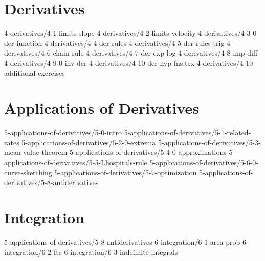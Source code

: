 \chapter{Derivatives}\label{chap:Derivatives}
	{4-derivatives/4-1-limits-slope}
	{4-derivatives/4-2-limits-velocity}
	{4-derivatives/4-3-0-der-function}
	{4-derivatives/4-4-der-rules}
	{4-derivatives/4-5-der-rules-trig}
	{4-derivatives/4-6-chain-rule}
	{4-derivatives/4-7-der-exp-log}
	{4-derivatives/4-8-imp-diff}
	{4-derivatives/4-9-0-inv-der}
	{4-derivatives/4-10-der-hyp-fns.tex}
	{4-derivatives/4-10-additional-exercises}
\chapter{Applications of Derivatives}\label{chap:ApplicationsOfDerivatives}
	{5-applications-of-derivatives/5-0-intro}
	{5-applications-of-derivatives/5-1-related-rates}
	{5-applications-of-derivatives/5-2-0-extrema}
	{5-applications-of-derivatives/5-3-mean-value-theorem}
	{5-applications-of-derivatives/5-4-0-approximations}
	{5-applications-of-derivatives/5-5-Lhospitals-rule}
	{5-applications-of-derivatives/5-6-0-curve-sketching}
	{5-applications-of-derivatives/5-7-optimization}
	{5-applications-of-derivatives/5-8-antiderivatives}
	
\chapter{Integration}\label{chap:Integration}
    {5-applications-of-derivatives/5-8-antiderivatives}
	{6-integration/6-1-area-prob}
	{6-integration/6-2-ftc}
	{6-integration/6-3-indefinite-integrals}
	
